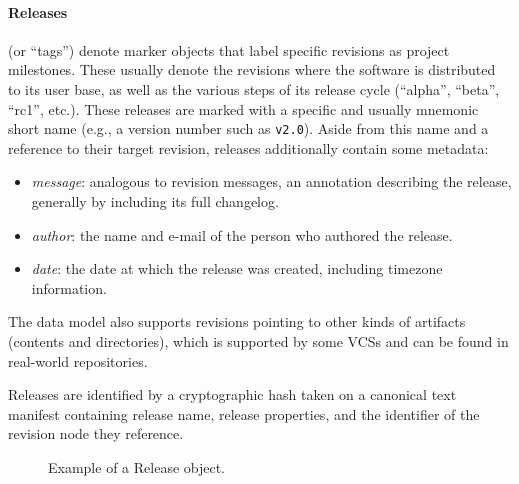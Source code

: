 \paragraph{\textbf{Releases}} (or ``tags'') denote marker objects that label
specific revisions as project milestones. These usually denote the revisions
where the software is distributed to its user base, as well as the various
steps of its release cycle (``alpha'', ``beta'', ``rc1'', etc.). These releases
are marked with a specific and usually mnemonic short name (e.g., a version
number such as \texttt{v2.0}). Aside from this name and a reference to their
target revision, releases additionally contain some metadata:

\begin{itemize}
    \setlength\itemsep{0em}
    \item \emph{message}: analogous to revision messages, an annotation
        describing the release, generally by including its full changelog.
    \item \emph{author}: the name and e-mail of the person who authored the
        release.
    \item \emph{date}: the date at which the release was created, including
        timezone information.
\end{itemize}

The data model also supports revisions pointing to other kinds of artifacts
(contents and directories), which is supported by some \glspl{VCS} and can be
found in real-world repositories.

Releases are identified by a cryptographic hash taken on a canonical text
manifest containing release name, release properties, and the identifier of the
revision node they reference.

\begin{figure}%
    \centering
\caption{Example of a Release object.}
\end{figure}


